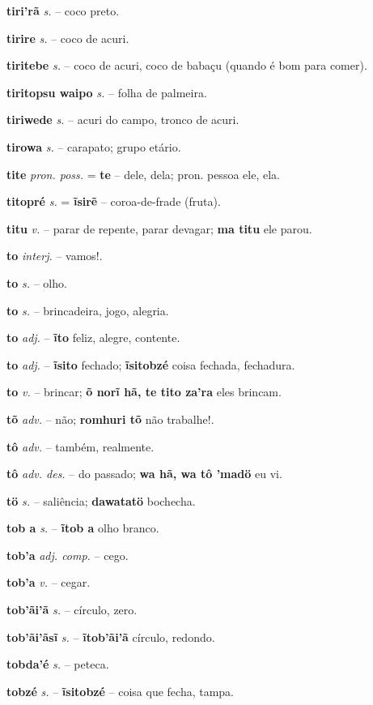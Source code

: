\textbf{tiri'rã} \textit{s.} -- coco preto.

\textbf{tirire} \textit{s.} -- coco de acuri.

\textbf{tiritebe} \textit{s.} -- coco de acuri, coco de babaçu (quando é bom para comer).

\textbf{tiritopsu waipo} \textit{s.} -- folha de palmeira.

\textbf{tiriwede} \textit{s.} -- acuri do campo, tronco de acuri.

\textbf{tirowa} \textit{s.} -- carapato; grupo etário.

\textbf{tite} \textit{pron. poss.} = \textbf{te} -- dele, dela; pron. pessoa ele, ela.

\textbf{titopré} \textit{s.} = \textbf{ĩsirẽ} -- coroa-de-frade (fruta).

\textbf{titu} \textit{v.} -- parar de repente, parar devagar; \textbf{ma titu} ele parou.

\textbf{to} \textit{interj.} -- vamos!.

\textbf{to} \textit{s.} -- olho.

\textbf{to} \textit{s.} -- brincadeira, jogo, alegria.

\textbf{to} \textit{adj.} -- \textbf{ĩto} feliz, alegre, contente.

\textbf{to} \textit{adj.} -- \textbf{ĩsito} fechado; \textbf{ĩsitobzé} coisa fechada, fechadura.

\textbf{to} \textit{v.} -- brincar; \textbf{õ norĩ hã, te tito za'ra} eles brincam.

\textbf{tõ} \textit{adv.} -- não; \textbf{romhuri tõ} não trabalhe!.

\textbf{tô} \textit{adv.} -- também, realmente.

\textbf{tô} \textit{adv. des.} -- do passado; \textbf{wa hã, wa tô 'madö} eu vi.

\textbf{tö} \textit{s.} -- saliência; \textbf{dawatatö} bochecha.

\textbf{tob a} \textit{s.} -- \textbf{ĩtob a} olho branco.

\textbf{tob'a} \textit{adj. comp.} -- cego.

\textbf{tob'a} \textit{v.} -- cegar.

\textbf{tob'ãi'ã} \textit{s.} -- círculo, zero.

\textbf{tob'ãi'ãsĩ} \textit{s.} -- \textbf{ĩtob'ãi'ã} círculo, redondo.

\textbf{tobda'é} \textit{s.} -- peteca.

\textbf{tobzé} \textit{s.} -- \textbf{ĩsitobzé} -- coisa que fecha, tampa.

